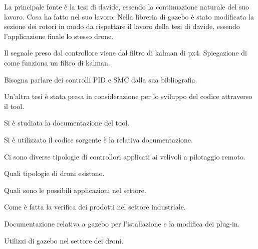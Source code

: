 \begin{idee}
	La principale fonte è la tesi di davide, essendo la continuazione naturale del suo lavoro.
	Cosa ha fatto nel suo lavoro.
	Nella libreria di gazebo è stato modificata la sezione dei rotori in modo da rispettare il lavoro della tesi di davide, essendo l'applicazione finale lo stesso drone.
	
	Il segnale preso dal controllore viene dal filtro di kalman di px4.
	Spiegazione di come funziona un filtro di kalman.
	
	Bisogna parlare dei controlli PID e SMC dalla sua bibliografia.
	
	Un'altra tesi è stata presa in considerazione per lo sviluppo del codice attraverso il tool. 
	
	Si è studiata la documentazione del tool.
	
	Si è utilizzato il codice sorgente è la relativa documentazione.
	
	Ci sono diverse tipologie di controllori applicati ai velivoli a pilotaggio remoto. 
	
	Quali tipologie di droni esistono.
	
	Quali sono le possibili applicazioni nel settore.
	
	Come è fatta la verifica dei prodotti nel settore industriale.
	
	Documentazione relativa a gazebo per l'istallazione e la modifica dei plug-in.
	
	Utilizzi di gazebo nel settore dei droni.
\end{idee}